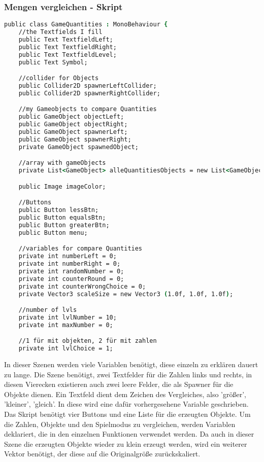 \subsubsection{Mengen vergleichen - Skript}
\begin{lstlisting}[language=csh, caption={GameQuantities.cs Variablen-Deklaration}]
public class GameQuantities : MonoBehaviour {
	//the Textfields I fill
	public Text TextfieldLeft;
	public Text TextfieldRight;
	public Text TextfieldLevel;
	public Text Symbol;

	//collider for Objects
	public Collider2D spawnerLeftCollider;
	public Collider2D spawnerRightCollider;

	//my Gameobjects to compare Quantities
	public GameObject objectLeft;
	public GameObject objectRight;
	public GameObject spawnerLeft;
	public GameObject spawnerRight;
	private GameObject spawnedObject;

	//array with gameObjects
	private List<GameObject> alleQuantitiesObjects = new List<GameObject>(40);

	public Image imageColor;

	//Buttons
	public Button lessBtn;
	public Button equalsBtn;
	public Button greaterBtn;
	public Button menu;

	//variables for compare Quantities
	private int numberLeft = 0;
	private int numberRight = 0;
	private int randomNumber = 0;
	private int counterRound = 0;
	private int counterWrongChoice = 0;
	private Vector3 scaleSize = new Vector3 (1.0f, 1.0f, 1.0f);

	//number of lvls
	private int lvlNumber = 10;
	private int maxNumber = 0;

	//1 für mit objekten, 2 für mit zahlen
	private int lvlChoice = 1;
\end{lstlisting}
In dieser Szenen werden viele Variablen benötigt, diese einzeln zu erklären dauert zu lange. Die Szene benötigt, zwei Textfelder für die Zahlen links und rechts, in diesen Vierecken existieren auch zwei leere Felder, die als Spawner für die Objekte dienen. Ein Textfeld dient dem Zeichen des Vergleiches, also 'größer', 'kleiner', 'gleich'. In diese wird eine dafür vorhergesehene Variable geschrieben. Das Skript benötigt vier Buttons und eine Liste für die erzeugten Objekte. Um die Zahlen, Objekte und den Spielmodus zu vergleichen, werden Variablen deklariert, die in den einzelnen Funktionen verwendet werden. Da auch in dieser Szene die erzeugten Objekte wieder zu klein erzeugt werden, wird ein weiterer Vektor benötigt, der diese auf die Originalgröße zurückskaliert.\\
